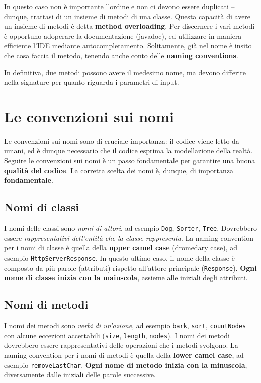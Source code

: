 \documentclass[\fontsizeclass,twocolumn]{\classname}
\let\oldtextsc\textsc
\renewcommand{\textsc}[1]{\oldtextsc{\scfontfs #1}}
\theoremstyle{definition}
\theoremstyle{definition}
\begin{document}
In questo caso non è importante l'ordine e non ci devono essere duplicati \---
dunque, trattasi di un insieme di metodi di una classe. Questa capacità di
avere un insieme di metodi è detta \textbf{method overloading}. Per discernere
i vari metodi è opportuno adoperare la documentazione (javadoc), ed utilizzare in
maniera efficiente l'\textsc{IDE} mediante autocompletamento. Solitamente, già nel nome
è insito che cosa faccia il metodo, tenendo anche conto delle \textbf{naming
conventions}.

In definitiva, due metodi possono avere il medesimo nome, ma devono differire
nella signature per quanto riguarda i parametri di input.

\section{Le convenzioni sui nomi}

Le convenzioni sui nomi sono di cruciale importanza: il codice viene letto da
umani, ed è dunque necessario che il codice esprima la modellazione della
realtà. Seguire le convenzioni sui nomi è un passo fondamentale per garantire
una buona \textbf{qualità del codice}. La corretta scelta dei nomi è, dunque,
di importanza \textbf{fondamentale}.

\subsection{Nomi di classi}

I nomi delle classi sono \emph{nomi di attori}, ad esempio \texttt{Dog},
\texttt{Sorter}, \texttt{Tree}. Dovrebbero essere \emph{rappresentativi
dell'entità che la classe rappresenta}. La naming convention per i nomi di
classe è quella della \textbf{upper camel case} (dromedary case), ad esempio
\texttt{HttpServerResponse}. In questo ultimo caso, il nome della classe è
composto da più parole (attributi) rispetto all'attore principale (\texttt{Response}).
\textbf{Ogni nome di classe inizia con la maiuscola}, assieme alle iniziali
degli attributi.

\subsection{Nomi di metodi}

I nomi dei metodi sono \emph{verbi di un'azione}, ad esempio \texttt{bark},
\texttt{sort}, \texttt{countNodes} con alcune eccezioni accettabili
(\texttt{size}, \texttt{length}, \texttt{nodes}). I nomi dei metodi dovrebbero
essere rappresentativi delle operazioni che i metodi svolgono. La naming
convention per i nomi di metodi è quella della \textbf{lower camel case}, ad
esempio \texttt{removeLastChar}. \textbf{Ogni nome di metodo inizia con la
minuscola}, diversamente dalle iniziali delle parole successive.
\end{document}
